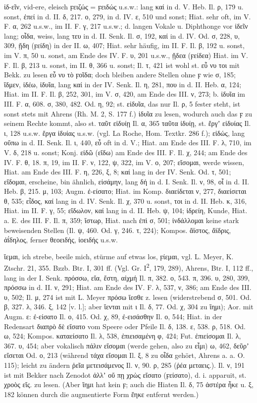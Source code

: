 ἰδ-εῖν, vid-ere, eleisch ϝειζώς = ϝειδώς u.s.w.: lang καί in d. V. Heb. Il. ρ, 179 u. sonst, ἐπεί in d. II. δ, 217. ο, 279, in d. IV. ε, 510 und sonst; Hiat. sehr oft, im V. F. α, 262 u.s.w., im II. F. γ, 217 u.s.w.; d. langen Vokale u. Diphthonge vor ἰδεῖν lang; οἶδα, weiss, lang τευ in d. II. Senk. Il. σ, 192, καί in d. IV. Od. σ, 228, υ, 309, ᾔδη (ϝείδη) in der II. ω, 407; Hiat. sehr häufig, im II. F. Il. β, 192 u. sonst, im V. π, 50 u. sonst, am Ende des IV. F. υ, 201 u.s.w., ᾔδεα (ϝείδεα) Hiat. im V. F. Il. β, 213 u. sonst, im II. θ, 366 u. sonst; Il. τ, 421 ist wohl st. εὖ νυ τοι mit Bekk. zu lesen εὖ νυ τὸ ϝοῖδα; doch bleiben andere Stellen ohne ϝ wie σ, 185; ἴδμεν, ἰδέω, ἰδυῖα, lang καί in der IV. Senk. Il. η, 281, που in d. II. Heb. α, 124; Hiat. im II. F. Il. β, 252, 301, im V. σ, 420, am Ende des III. ν, 273; b. ἰδυῖα im III. F. α, 608. σ, 380, 482. Od. η, 92; st. εἰδυῖα, das nur Il. ρ, 5 fester steht, ist sonst stets mit Ahrens (Rh. M. 2, S. 177 f.) ἰδυῖα zu lesen, wodurch auch das ϝ zu seinem Rechte kommt, also st. ταῦτ εἰδυίῃ Il. α, 365 ταῦτα ἰδυίῃ, st. ἔργʼ εἰδυίας Il. ι, 128 u.s.w. ἔργα ἰδυίας u.s.w. (vgl. La Roche, Hom. Textkr. 286 f.); εἰδώς, lang οὔπω in d. II. Senk. Il. ι, 440, εὖ oft in d. V.; Hiat. am Ende des III. F. λ, 710, im V. δ, 218 u. sonst; Konj. εἰδῶ (εἴδω) am Ende des III. F. Il. χ, 244; am Ende des IV. F. θ, 18. π, 19, im II. F. ν, 122, ψ, 322, im V. ο, 207; εἴσομαι, werde wissen, Hiat. am Ende des III. F. η, 226, ξ, 8; καί lang in der IV. Senk. Od. τ, 501; εἴδομαι, erscheine, bin ähnlich, εἰσάμην, lang δή in d. I. Senk. Il. ν, 98, οἷ in d. II. Heb. β, 215. μ, 103; Augm. ἐ-είσατο; Hiat. im Komp. διαείδεται ν, 277, διαείσεται θ, 535; εἶδος, καί lang in d. IV. Senk. Il. χ, 370 u. sonst, τοι in d. II. Heb. κ, 316, Hiat. im II. F. γ, 55; εἴδωλον, καί lang in d. II. Heb. ψ, 104; ἰδρείη, Kunde, Hiat. a. E. des III. F. Il. π, 359; ἴστωρ, Hiat. nach ἐπὶ σ, 501; ἰνδάλλομαι keine stark beweisenden Stellen (Il. ψ, 460. Od. γ, 246. τ, 224); Kompos. ἄϊστος, ἄϊδρις, ἀΐδηλος, ferner θεοειδής, ἰοειδής u.s.w.

ἵεμαι, ich strebe, beeile mich, stürme auf etwas los, ϝίεμαι, vgl. L. Meyer, K. Ztschr. 21, 355. Bzzb. Btr. I, 301 ff. (Vgl. Gr. I\textsuperscript{2}, 179, 289), Ahrens, Btr. I, 112 ff., lang in der I. Senk. πρόσσω, εἴα, ἔστη, αἰχμή Il. π, 382. ο, 543. π, 396. υ, 280, 399, πρόσσω in d. II. ν, 291; Hiat. am Ende des IV. F. λ, 537, ν, 386; am Ende des III. υ, 502; Il. μ, 274 ist mit L. Meyer πρόσω ἵεσθε z. lesen (widerstrebend σ, 501. Od. β, 327. λ, 346. ξ, 142 [v. l.]; aber ἵενται mit ι Il. δ, 77. Od. χ, 304 zu ἵημι); Aor. mit Augm. ε: ἐ-είσατο Il. ο, 415. Od. χ, 89, ἐ-εισάσθην Il. ο, 544; Hiat. in der Redensart διαπρὸ δὲ εἴσατο vom Speere oder Pfeile Il. δ, 138. ε, 538. ρ, 518. Od. ω, 524; Kompos. καταείσατο Il. λ, 538, ἐπιεισαμένη φ, 424; Fut. ἐπιείσομαι Il. λ, 367. υ, 454; aber vokalisch πάλιν εἴσομαι (werde gehen, also zu εἶμι) ω, 462, δεῦρʼ εἴσεται Od. ο, 213 (während τάχα εἴσομαι Il. ξ, 8 zu οἶδα gehört, Ahrens a. a. O. 115); leicht zu ändern ῥεῖα μετεισάμενος Il. ν, 90. ρ, 285 (ῥέα μεταεις.). Il. ν, 191 ist mit Bekker nach Zenodot ἀλλʼ οὔ πῃ χρὼς εἴσατο (ϝείσατο), d. i. apparuit, st. χροὸς εἴς. zu lesen. (Aber ἵημι hat kein ϝ; auch die Hiaten Il. δ, 75 ἀστέρα ἧκε u. ξ, 182 können durch die augmentierte Form ἕηκε entfernt werden.)

